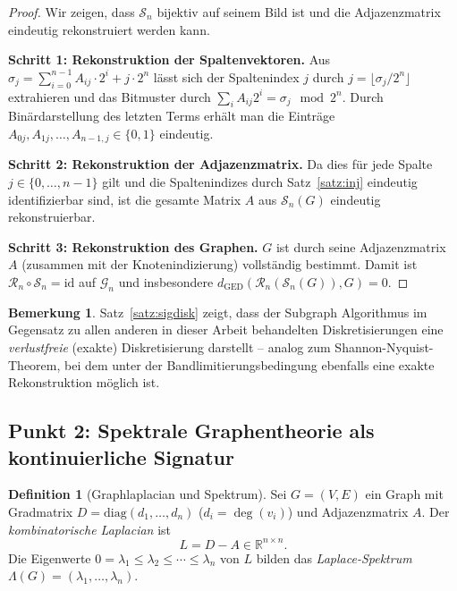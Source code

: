 ﻿\documentclass[a4paper,12pt]{article}
\theoremstyle{definition}
\newtheorem{definition}{Definition}
\newtheorem{bemerkung}{Bemerkung}
\begin{document}
\begin{proof}
    Wir zeigen, dass $\mathcal{S}_n$ bijektiv auf seinem Bild ist und die Adjazenzmatrix
    eindeutig rekonstruiert werden kann.

    \textbf{Schritt 1: Rekonstruktion der Spaltenvektoren.}
    Aus $\sigma_j = \sum_{i=0}^{n-1} A_{ij} \cdot 2^i + j \cdot 2^n$ lässt sich
    der Spaltenindex $j$ durch $j = \lfloor \sigma_j / 2^n \rfloor$ extrahieren und
    das Bitmuster durch $\sum_{i} A_{ij} 2^i = \sigma_j \mod 2^n$.
    Durch Binärdarstellung des letzten Terms erhält man die Einträge
    $A_{0j}, A_{1j}, \ldots, A_{n-1,j} \in \{0,1\}$ eindeutig.

    \textbf{Schritt 2: Rekonstruktion der Adjazenzmatrix.}
    Da dies für jede Spalte $j \in \{0,\ldots,n-1\}$ gilt und die Spaltenindizes durch
    Satz~\ref{satz:inj} eindeutig identifizierbar sind, ist die gesamte Matrix $A$ aus
    $\mathcal{S}_n(G)$ eindeutig rekonstruierbar.

    \textbf{Schritt 3: Rekonstruktion des Graphen.}
    $G$ ist durch seine Adjazenzmatrix $A$ (zusammen mit der Knotenindizierung) vollständig
    bestimmt. Damit ist $\mathcal{R}_n \circ \mathcal{S}_n = \mathrm{id}$ auf $\mathcal{G}_n$
    und insbesondere $d_{\mathrm{GED}}(\mathcal{R}_n(\mathcal{S}_n(G)), G) = 0$. \qedhere
\end{proof}

\begin{bemerkung}
    Satz~\ref{satz:sigdisk} zeigt, dass der Subgraph Algorithmus im Gegensatz zu allen anderen
    in dieser Arbeit behandelten Diskretisierungen eine \emph{verlustfreie} (exakte)
    Diskretisierung darstellt -- analog zum Shannon-Nyquist-Theorem, bei dem unter der
    Bandlimitierungsbedingung ebenfalls eine exakte Rekonstruktion möglich ist.
\end{bemerkung}

\subsection{Punkt 2: Spektrale Graphentheorie als kontinuierliche Signatur}

\begin{definition}[Graphlaplacian und Spektrum]
    Sei $G = (V,E)$ ein Graph mit Gradmatrix $D = \mathrm{diag}(d_1,\ldots,d_n)$
    ($d_i = \deg(v_i)$) und Adjazenzmatrix $A$. Der \emph{kombinatorische Laplacian} ist
    \[
    L = D - A \in \mathbb{R}^{n \times n}.
    \]
    Die Eigenwerte $0 = \lambda_1 \leq \lambda_2 \leq \cdots \leq \lambda_n$ von $L$ bilden
    das \emph{Laplace-Spektrum} $\Lambda(G) = (\lambda_1, \ldots, \lambda_n)$.
\end{definition}
\end{document}
